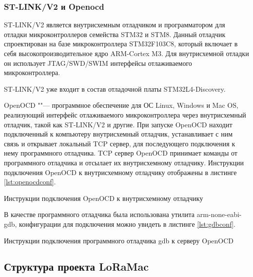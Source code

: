 

\subsubsection{ST-LINK/V2 и Openocd}

ST-LINK/V2 является внутрисхемным отладчиком и программатором для отладки 
микроконтроллеров семейства STM32 и STM8.
Данный отладчик спроектирован на базе микроконтроллера STM32F103C8, который 
включает в себя высокопроизводительное ядро ARM-Cortex M3.
Для внутрисхемной отладки он использует JTAG/SWD/SWIM интерфейсы отлаживаемого 
микроконтроллера.

ST-LINK/V2 уже входит в состав отладочной платы STM32L4-Discovery.

OpenOCD ""--- программное обеспечение для ОС Linux, Windows и Mac OS, 
реализующий интерфейс отлаживаемого микроконтроллера через внутрисхемный 
отладчик, такой как ST-LINK/V2 и другие. 
При запуске OpenOCD находит подключенный к компьютеру внутрисхемный отладчик, 
устанавливает с ним связь и открывает локальный TCP сервер, для последующего 
подключения к нему программного отладчика. 
TCP сервер OpenOCD принимает команды от программного отладчика и отсылает их 
внутрисхемному отладчику.
Инструкции подключения OpenOCD к внутрисхемному отладчику отображены в листинге 
\ref{lst:openocdconf}.

\begin{listing}[H]
\caption{Инструкции подключения OpenOCD к внутрисхемному отладчику} 
\label{lst:openocdconf}
\end{listing}

В качестве программного отладчика была использована утилита arm-none-eabi-gdb, 
конфигурации для подключения можно увидеть в листинге \ref{lst:gdbconf}.

\begin{listing}[H]
\caption{Инструкции подключения программного отладчика gdb к серверу OpenOCD} 
\label{lst:gdbconf}
\end{listing}

\subsection{Структура проекта LoRaMac}

